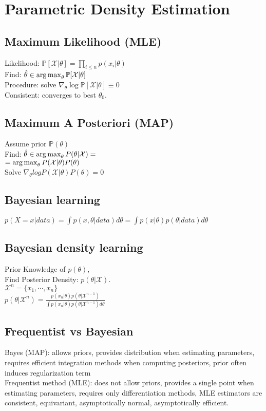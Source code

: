 \section*{Parametric Density Estimation}
\subsection*{Maximum Likelihood (MLE)}
Likelihood: $\mathbb{P}[\mathcal{X}|\theta]=\prod_{i\leq n}p(x_i|\theta)$\\
Find: $\hat{\theta}\in \operatorname*{arg\,max}_\theta \mathbb{P}[\mathcal{X}|\theta]$\\
Procedure: solve $\nabla_\theta \log \mathbb{P}[\mathcal{X}|\theta]\equiv 0$\\
Consistent: converges to best $\theta_0$.

\subsection*{Maximum A Posteriori (MAP)}
Assume prior $\mathbb{P}(\theta)$\\
Find: $\hat{\theta}\in \operatorname*{arg\,max}_\theta P(\theta|\mathcal{X}) =$\\
$=\operatorname*{arg\,max}_\theta P(\mathcal{X}|\theta)P(\theta)$\\
Solve $\nabla_\theta log P(\mathcal{X}|\theta)P(\theta)=0$

\subsection*{Bayesian learning}
$p(X=x|data) = \int p(x, \theta | data) d\theta = \int p(x|\theta)p(\theta|data)d\theta$
\subsection*{Bayesian density learning}
Prior Knowledge of $p(\theta)$,\\
Find Posterior Density: $p(\theta|\mathcal{X})$.\\
$\mathcal{X}^n=\{x_1, \cdots, x_n\}$\\
$p(\theta|\mathcal{X}^n)=\frac{p(x_n|\theta)p(\theta|\mathcal{X}^{n-1})}{\int p(x_n|\theta)p(\theta|\mathcal{X}^{n-1}) d\theta}$


\subsection*{Frequentist vs Bayesian}
Bayes (MAP): allows priors, provides distribution when estimating parameters, requires efficient integration methods when computing posteriors, prior often induces regularization term \\
Frequentist method (MLE): does not allow priors, provides a single point when estimating parameters, requires only differentiation methods, MLE estimators are consistent, equivariant, asymptotically normal, asymptotically efficient. 

